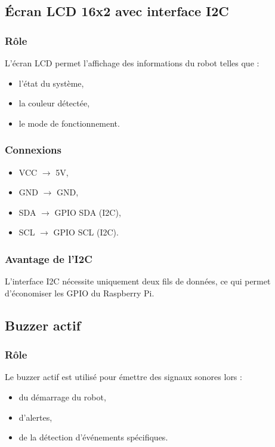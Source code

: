 
\subsection{Écran LCD 16x2 avec interface I2C}

\subsubsection{Rôle}
L’écran LCD permet l’affichage des informations du robot telles que :
\begin{itemize}
    \item l’état du système,
    \item la couleur détectée,
    \item le mode de fonctionnement.
\end{itemize}

\subsubsection{Connexions}
\begin{itemize}
    \item VCC $\rightarrow$ 5V,
    \item GND $\rightarrow$ GND,
    \item SDA $\rightarrow$ GPIO SDA (I2C),
    \item SCL $\rightarrow$ GPIO SCL (I2C).
\end{itemize}

\subsubsection{Avantage de l’I2C}
L’interface I2C nécessite uniquement deux fils de données, ce qui permet d’économiser les GPIO du Raspberry Pi.


\subsection{Buzzer actif}

\subsubsection{Rôle}
Le buzzer actif est utilisé pour émettre des signaux sonores lors :
\begin{itemize}
    \item du démarrage du robot,
    \item d’alertes,
    \item de la détection d’événements spécifiques.
\end{itemize}

